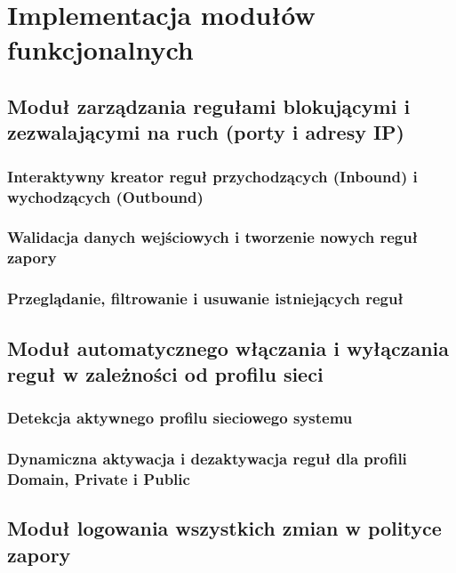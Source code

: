 \chapter{Implementacja modułów funkcjonalnych}\label{ch:implementacja}

\section{Moduł zarządzania regułami blokującymi i zezwalającymi na ruch (porty i adresy IP)}\label{sec:modul-reguly}

\subsection{Interaktywny kreator reguł przychodzących (Inbound) i wychodzących (Outbound)}\label{subsec:kreator-regul}

\subsection{Walidacja danych wejściowych i tworzenie nowych reguł zapory}\label{subsec:implementacja-new-rule}

\subsection{Przeglądanie, filtrowanie i usuwanie istniejących reguł}\label{subsec:przegladanie-usuwanie-regul}

\section{Moduł automatycznego włączania i wyłączania reguł w zależności od profilu sieci}\label{sec:modul-profile}

\subsection{Detekcja aktywnego profilu sieciowego systemu}\label{subsec:detekcja-profilu}

\subsection{Dynamiczna aktywacja i dezaktywacja reguł dla profili Domain, Private i Public}\label{subsec:aktywacja-regul-profil}

\section{Moduł logowania wszystkich zmian w polityce zapory}\label{sec:modul-logowanie}


